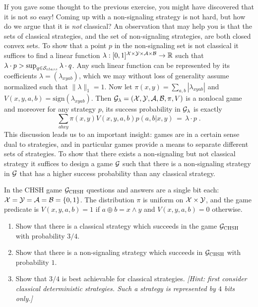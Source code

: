 If you gave some thought to the previous exercise, you might have discovered that it is not so easy! Coming up with a non-signaling strategy is not hard, but how do we argue that it is \emph{not} classical? An observation that may help you is that the sets of classical strategies, and the set of non-signaling strategies, are both closed convex sets. To show that a point $p$ in the non-signaling set is not classical it suffices to find a linear function $\lambda:[0,1]^{\mathcal{X}\times\mathcal{Y}\times \mathcal{A}\times \mathcal{B}} \to \mathbb{R}$ such that $\lambda\cdot p > \sup_{q\in \mathcal{S}_{class}} \lambda\cdot q$.
Any such linear function can be represented by its coefficients $\lambda = (\lambda_{xyab})$, which we may without loss of generality assume normalized such that $\|\lambda\|_1=1$. Now let $\pi(x,y)=\sum_{a,b}|\lambda_{xyab}|$ and $V(x,y,a,b)=\text{sign}(\lambda_{xyab})$. Then $\mathcal{G}_\lambda=(\mathcal{X},\mathcal{Y},\mathcal{A},\mathcal{B},\pi,V)$ is a nonlocal game and moreover for any strategy $p$, its success probability in $\mathcal{G}_\lambda$ is exactly
\[\sum_{abxy} \pi(x,y)V(x,y,a,b)p(a,b|x,y) \,=\, \lambda \cdot p\;.\]
This discussion leads us to an important insight: games are in a certain sense dual to strategies, and in particular games provide a means to separate different sets of strategies. To show that there exists a non-signaling but not classical strategy it suffices to design a game $\mathcal{G}$ such that there is a non-signaling strategy in $\mathcal{G}$ that has a higher success probability than any classical strategy.

\begin{example}\label{ex:chsh}
In the CHSH game $\mathcal{G}_{\textsc{CHSH}}$ questions and answers are a single bit each: $\mathcal{X}=\mathcal{Y}=\mathcal{A}=\mathcal{B}=\{0,1\}$. The distribution $\pi$ is uniform on $\mathcal{X}\times \mathcal{Y}$, and the game predicate is $V(x,y,a,b)=1$ if $a\oplus b = x\wedge y$ and $V(x,y,a,b)=0$ otherwise. 
\end{example}

\begin{exercise}\label{ex:chsh-bias}
\begin{enumerate}
\item Show that there is a classical strategy which succeeds in the game $\mathcal{G}_{\textsc{CHSH}}$ with probability $3/4$.
\item Show that there is a non-signaling strategy which succeeds in $\mathcal{G}_{\textsc{CHSH}}$ with probability $1$.  
\item Show that $3/4$ is best achievable for classical strategies. \emph{[Hint: first consider classical deterministic strategies. Such a strategy is represented by $4$ bits only.]}
\end{enumerate}
\end{exercise}

